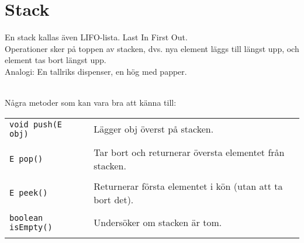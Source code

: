 \documentclass[11pt]{article}
\begin{document}
\section{Stack}
En stack kallas även LIFO-lista. Last In First Out. \\
Operationer sker på toppen av stacken, dvs. nya element läggs till längst upp, och element tas bort längst upp. \\
Analogi: En tallriks dispenser, en hög med papper. \\
\begin{figure}[h]
  \begin{center}
  \end{center}
  \label{bild1}
\end{figure}
\\
Några metoder som kan vara bra att känna till: \\
\begin{tabular}{l|l}
\hline
	\verb+void push(E obj)+	&	Lägger obj överst på stacken. \\  \\
	\verb+E pop()+	&	Tar bort och returnerar översta elementet från stacken. \\ \\
	\verb+E peek()+		&	Returnerar första elementet i kön (utan att ta bort det). \\ \\
	\verb+boolean isEmpty()+	&	Undersöker om stacken är tom. \\ \\
\hline	
\end{tabular}
\end{document}
